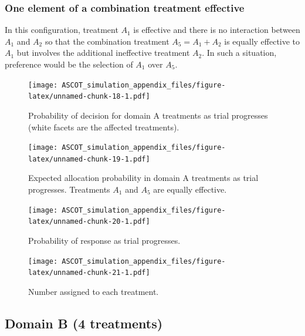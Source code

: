 \documentclass[
]{article}
\begin{document}
\clearpage

\hypertarget{one-element-of-a-combination-treatment-effective}{%
\subsubsection{One element of a combination treatment effective}\label{one-element-of-a-combination-treatment-effective}}

In this configuration, treatment \(A_1\) is effective and there is no interaction between \(A_1\) and \(A_2\) so that the combination treatment \(A_5=A_1+A_2\) is equally effective to \(A_1\) but involves the additional ineffective treatment \(A_2\).
In such a situation, preference would be the selection of \(A_1\) over \(A_5\).

\begin{figure}
\centering
\texttt{[image: ASCOT\_simulation\_appendix\_files/figure-latex/unnamed-chunk-18-1.pdf]}
\caption{\label{fig:unnamed-chunk-18}Probability of decision for domain A treatments as trial progresses (white facets are the affected treatments).}
\end{figure}

\begin{figure}
\centering
\texttt{[image: ASCOT\_simulation\_appendix\_files/figure-latex/unnamed-chunk-19-1.pdf]}
\caption{\label{fig:unnamed-chunk-19}Expected allocation probability in domain A treatments as trial progresses. Treatments \(A_1\) and \(A_5\) are equally effective.}
\end{figure}

\begin{figure}
\centering
\texttt{[image: ASCOT\_simulation\_appendix\_files/figure-latex/unnamed-chunk-20-1.pdf]}
\caption{\label{fig:unnamed-chunk-20}Probability of response as trial progresses.}
\end{figure}

\begin{figure}
\centering
\texttt{[image: ASCOT\_simulation\_appendix\_files/figure-latex/unnamed-chunk-21-1.pdf]}
\caption{\label{fig:unnamed-chunk-21}Number assigned to each treatment.}
\end{figure}

\clearpage

\hypertarget{domain-b-4-treatments}{%
\subsection{Domain B (4 treatments)}\label{domain-b-4-treatments}}
\end{document}
